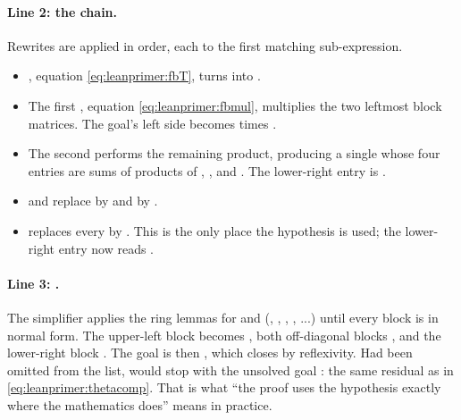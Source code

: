 \paragraph{Line 2: the  chain.} Rewrites are applied in order, each to the first
matching sub-expression.
\begin{itemize}[leftmargin=*,itemsep=1pt]
\item {}, equation \eqref{eq:leanprimer:fbT}, turns
   into .
\item The first , equation \eqref{eq:leanprimer:fbmul},
  multiplies the two leftmost block matrices. The goal's left side becomes
  times .
\item The second  performs the remaining product, producing a
  single  whose four entries are sums of products of ,
  ,  and . The lower-right entry is
  .
\item {} and  replace 
  by  and  by .
\item {} replaces every  by . This is the only place the
  hypothesis is used; the lower-right entry now reads
  .
\end{itemize}

\paragraph{Line 3: .} The simplifier applies the ring lemmas for  and
 (, , , , ...)
until every block is in normal form. The upper-left block becomes , both
off-diagonal blocks , and the lower-right block
. The goal is then
, which  closes by reflexivity.
Had  been omitted from the  list,  would stop with the
unsolved goal : the same residual as in
\eqref{eq:leanprimer:thetacomp}. That is what ``the proof uses the hypothesis exactly where
the mathematics does'' means in practice.

